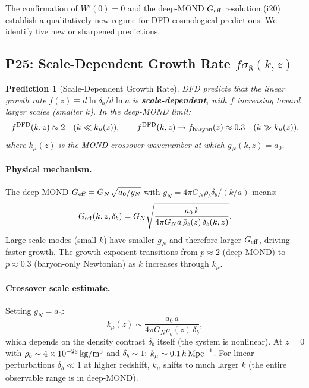 \documentclass[11pt]{article}
\newcommand{\Geff}{G_{\rm eff}}
\newcommand{\aM}{a_0}
\newtheorem{prediction}{Prediction}
\begin{document}
The confirmation of $W'(0) = 0$ and the deep-MOND $\Geff$ resolution
(i20) establish a qualitatively new regime for DFD cosmological
predictions.  We identify five new or sharpened predictions.

\subsection{P25: Scale-Dependent Growth Rate $f\sigma_8(k,z)$}

\begin{prediction}[Scale-Dependent Growth Rate]
\label{pred:fsigma8}
DFD predicts that the linear growth rate $f(z) \equiv d\ln\delta_b/d\ln a$
is \textbf{scale-dependent}, with $f$ increasing toward larger scales
(smaller $k$).  In the deep-MOND limit:
\begin{equation}
f^{\rm DFD}(k,z) \approx 2 \quad (k \ll k_\mu(z)),
\qquad
f^{\rm DFD}(k,z) \to f_{\rm baryon}(z) \approx 0.3 \quad (k \gg k_\mu(z)),
\end{equation}
where $k_\mu(z)$ is the MOND crossover wavenumber at which
$g_N(k,z) = \aM$.
\end{prediction}

\paragraph{Physical mechanism.}
The deep-MOND $\Geff = G_N\sqrt{\aM/g_N}$ with
$g_N = 4\pi G_N \bar\rho_b \delta_b / (k/a)$ means:
\begin{equation}
\Geff(k,z,\delta_b) = G_N \sqrt{\frac{\aM\,k}{4\pi G_N a\,\bar\rho_b(z)\,\delta_b(k,z)}}.
\end{equation}
Large-scale modes (small $k$) have smaller $g_N$ and therefore larger
$\Geff$, driving faster growth.  The growth exponent transitions from
$p \approx 2$ (deep-MOND) to $p \approx 0.3$ (baryon-only Newtonian)
as $k$ increases through $k_\mu$.

\paragraph{Crossover scale estimate.}
Setting $g_N = \aM$:
\begin{equation}
k_\mu(z) \sim \frac{\aM\,a}{4\pi G_N \bar\rho_b(z)\,\delta_b},
\end{equation}
which depends on the density contrast $\delta_b$ itself (the system is
nonlinear).  At $z = 0$ with $\bar\rho_b \sim 4 \times 10^{-28}\,
{\rm kg/m^3}$ and $\delta_b \sim 1$:
$k_\mu \sim 0.1\,h\,{\rm Mpc}^{-1}$.  For linear perturbations
$\delta_b \ll 1$ at higher redshift, $k_\mu$ shifts to much larger $k$
(the entire observable range is in deep-MOND).
\end{document}
